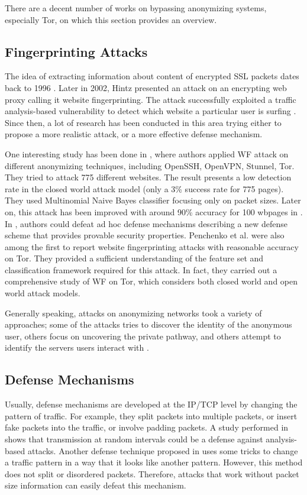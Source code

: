 
There are a decent number of works on bypassing anonymizing systems, especially Tor, on which this section provides an overview.

\subsection{Fingerprinting Attacks}
The idea of extracting information about content of encrypted SSL packets dates back to 1996 \cite{wagner96}. Later in 2002, Hintz presented an attack on an encrypting web proxy calling it website fingerprinting. The attack successfully exploited a traffic analysis-based vulnerability to detect which website a particular user is surfing \cite{hintz2003}. Since then, a lot of research has been conducted in this area trying either to propose a more realistic attack, or a more effective defense mechanism.

One interesting study has been done in \cite{herrmann2009}, where authors applied WF attack on different anonymizing techniques, including OpenSSH, OpenVPN, Stunnel, Tor. They tried to attack 775 different websites. The result presents a low detection rate in the closed world attack model (only a 3\% success rate for 775 pages). They used Multinomial Naive Bayes classifier focusing only on packet sizes. Later on, this attack has been improved with around 90\% accuracy for 100 wbpages in \cite{wang2013improved, cai2012touching}. In \cite{cai2012touching}, authors could defeat ad hoc defense mechanisms describing a new defense scheme that provides provable security properties. Penchenko et al. \cite{panchenko11} were also among the first to report website fingerprinting attacks with reasonable accuracy on Tor. They provided a sufficient understanding of the feature set and classification framework required for this attack. In fact, they carried out a comprehensive study of WF on Tor, which considers both closed world and open world attack models.

Generally speaking, attacks on anonymizing networks took a variety of approaches; some of the attacks tries to discover the identity of the anonymous user, others focus on uncovering the private pathway, and others attempt to identify the servers users interact with  \cite{cai2012touching}.

\subsection{Defense Mechanisms}
Usually, defense mechanisms are developed at the IP/TCP level by changing the pattern of traffic. For example, they split packets into multiple packets, or insert fake packets into the traffic, or involve padding packets. A study performed in \cite{fu2003} shows that transmission at random intervals could be a defense against analysis-based attacks. Another defense technique proposed in \cite{wright2009} uses some tricks to change a traffic pattern in a way that it looks like another pattern. However, this method does not split or disordered packets. Therefore, attacks that work without packet size information can easily defeat this mechanism.

